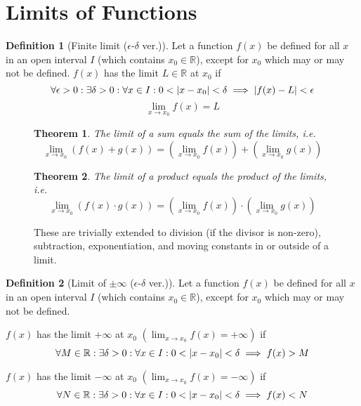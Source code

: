 \documentclass{article}
\theoremstyle{plain}
\newtheorem{theorem}{Theorem}[section]
\numberwithin{theorem}{section}
\theoremstyle{definition}
\newtheorem{definition}{Definition}[section]
\numberwithin{definition}{section}
\newcommand*{\R}{\mathbb{R}}
\begin{document}
\section{Limits of Functions}
\begin{definition}[Finite limit ($\epsilon$-$\delta$ ver.)]
    Let a function $f(x)$ be defined for all $x$ in an open interval $I$
    (which contains $x_0 \in \R$), except for $x_0$ which may or may not be defined.
    $f(x)$ has the limit $L \in \R$ at $x_0$ if
    \[ \forall\epsilon>0: \exists\delta>0: \forall x \in I: 0<\abs{x-x_0}<\delta
    \implies \abs{f(x)-L}<\epsilon \]
    \[ \lim_{x\to x_0} f(x) = L \]
\end{definition}
%
\begin{figure}[H]
\begin{mdframed}[style=exampledefault,frametitle={Limit laws}]
    \begin{theorem} The limit of a sum equals the sum of the limits, i.e.
        \begin{equation*}
              \lim_{x\to x_0}\left(f(x)+g(x)\right)
            = \left(\lim_{x\to x_0}f(x)\right) + \left(\lim_{x\to x_0}g(x)\right)
        \end{equation*}
    \end{theorem}
    \begin{theorem} The limit of a product equals the product of the limits, i.e.
        \begin{equation*}
          \lim_{x\to x_0}\left(f(x)\cdot g(x)\right)
        = \left(\lim_{x\to x_0}f(x)\right) \cdot \left(\lim_{x\to x_0}g(x)\right)
        \end{equation*}
    \end{theorem}

        These are trivially extended to
        division (if the divisor is non-zero),
        subtraction, exponentiation, and moving constants in or outside of a limit.
\end{mdframed}
\end{figure}
%
\begin{definition}[Limit of $\pm\infty$ ($\epsilon$-$\delta$ ver.)]
    Let a function $f(x)$ be defined for all $x$ in an open interval $I$
    (which contains $x_0 \in \R$), except for $x_0$ which may or may not be defined.

    $f(x)$ has the limit $+\infty$ at $x_0$
    \(\left(\displaystyle\lim_{x\to x_0} f(x) = +\infty\right)\) if
    \[ \forall M \in \R: \exists\delta>0: \forall x \in I: 0<\abs{x-x_0}<\delta
    \implies f(x) > M \]

    $f(x)$ has the limit $-\infty$ at $x_0$
    \(\left(\displaystyle\lim_{x\to x_0} f(x) = -\infty\right)\) if
        \[ \forall N \in \R: \exists\delta>0: \forall x \in I: 0<\abs{x-x_0}<\delta
            \implies f(x) < N \]
\end{definition}
\end{document}

